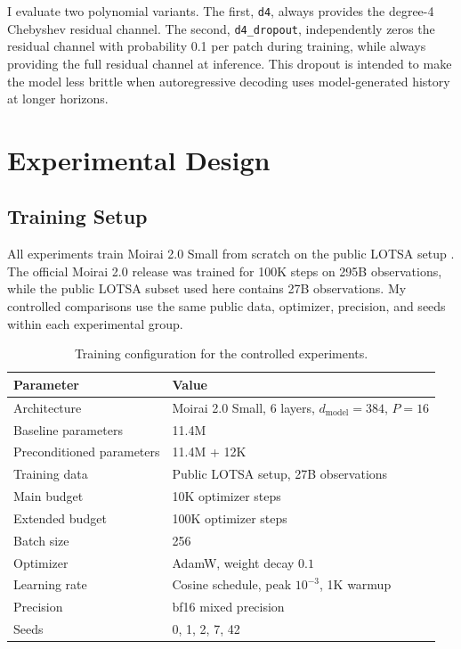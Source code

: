 \documentclass[11pt]{article}
\begin{document}
I evaluate two polynomial variants. The first, \texttt{d4}, always provides the degree-4 Chebyshev residual channel. The second, \texttt{d4\_dropout}, independently zeros the residual channel with probability 0.1 per patch during training, while always providing the full residual channel at inference. This dropout is intended to make the model less brittle when autoregressive decoding uses model-generated history at longer horizons.

\section{Experimental Design}

\subsection{Training Setup}

All experiments train Moirai 2.0 Small from scratch on the public LOTSA setup \citep{woo2024unified}. The official Moirai 2.0 release was trained for 100K steps on 295B observations, while the public LOTSA subset used here contains 27B observations. My controlled comparisons use the same public data, optimizer, precision, and seeds within each experimental group.

\begin{table}[H]
\centering
\caption{Training configuration for the controlled experiments.}
\begin{tabular}{ll}
\toprule
Parameter & Value \\
\midrule
Architecture & Moirai 2.0 Small, 6 layers, $d_{\mathrm{model}}=384$, $P=16$ \\
Baseline parameters & 11.4M \\
Preconditioned parameters & 11.4M + 12K \\
Training data & Public LOTSA setup, 27B observations \\
Main budget & 10K optimizer steps \\
Extended budget & 100K optimizer steps \\
Batch size & 256 \\
Optimizer & AdamW, weight decay $0.1$ \\
Learning rate & Cosine schedule, peak $10^{-3}$, 1K warmup \\
Precision & bf16 mixed precision \\
Seeds & 0, 1, 2, 7, 42 \\
\bottomrule
\end{tabular}
\label{tab:training}
\end{table}
\end{document}
